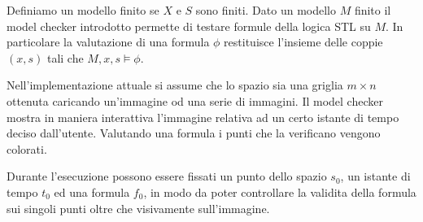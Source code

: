 \documentclass[a4paper,11pt]{article}
\renewcommand{\(}{\left(}
\renewcommand{\)}{\right)}
\newcommand{\<}{\textlangle}
\renewcommand{\>}{\textrangle}
\begin{document}
Definiamo un modello finito se $X$ e $S$ sono finiti. Dato un modello $M$ finito il model checker introdotto permette di testare formule della logica STL su $M$. In particolare la valutazione di una formula $\phi$ restituisce l'insieme delle coppie $(x,s)$ tali che $M,x,s\vDash \phi$.

Nell'implementazione attuale si assume che lo spazio sia una griglia $m \times n$ ottenuta caricando un'immagine od una serie di immagini. Il model checker mostra in maniera interattiva l'immagine relativa ad un certo istante di tempo deciso dall'utente. Valutando una formula i punti che la verificano vengono colorati.

Durante l'esecuzione possono essere fissati un punto dello spazio $s_0$, un istante di tempo $t_0$ ed una formula $f_0$, in modo da poter controllare la validita della formula sui singoli punti oltre che visivamente sull'immagine.
\end{document}
